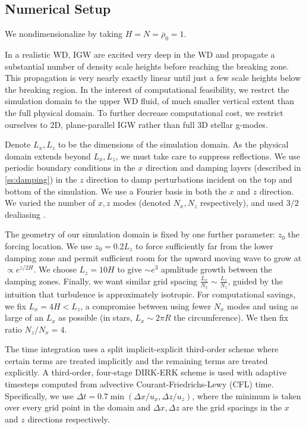 \documentclass[
        fleqn,
        usenatbib,
    ]{mnras}
\begin{document}
\subsection{Numerical Setup}\label{ss:numerics}

We nondimensionalize by taking $H = N = \overline{\rho}_0 = 1$.

In a realistic WD, IGW are excited very deep in the WD and propagate a
substantial number of density scale heights before reaching the breaking zone.
This propagation is very nearly exactly linear until just a few scale heights
below the breaking region. In the interest of computational feasibility, we
restrct the simulation domain to the upper WD fluid, of much smaller vertical
extent than the full physical domain. To further decrease computational cost, we
restrict ourselves to 2D, plane-parallel IGW rather than full 3D stellar
g-modes.

Denote $L_x, L_z$ to be the dimensions of the simulation domain. As the physical
domain extends beyond $L_x, L_z$, we must take care to suppress reflections. We
use periodic boundary conditions in the $x$ direction and damping layers
(described in \autoref{ss:damping}) in the $z$ direction to damp perturbations
incident on the top and bottom of the simulation. We use a Fourier basis in both
the $x$ and $z$ direction. We varied the number of $x, z$ modes (denoted $N_x,
N_z$ respectively), and used $3/2$ dealiasing \citep{boyd}.

The geometry of our simulation domain is fixed by one further parameter: $z_0$
the forcing location. We use $z_0 = 0.2L_z$ to force sufficiently far from the
lower damping zone and permit sufficient room for the upward moving wave to
grow at $\propto e^{z/2H}$. We choose $L_z = 10H$ to give $\sim e^3$ apmlitude
growth between the damping zones. Finally, we want similar grid spacing
$\frac{L_x}{N_x} \sim \frac{L_z}{N_z}$, guided by the intuition that turbulence
is approximately isotropic. For computational savings, we fix $L_x = 4H < L_z$,
a compromise between using fewer $N_x$ modes and using as large of an $L_x$ as
possible (in stars, $L_x \sim 2\pi R$ the circumference). We then fix ratio $N_z
/ N_x = 4$.

The time integration uses a split implicit-explicit third-order scheme where
certain terms are treated implicitly and the remaining terms are treated
explicitly. A third-order, four-stage DIRK-ERK scheme \citep{ascher} is used
with adaptive timesteps computed from advective Courant-Friedrichs-Lewy (CFL)
time. Specifically, we use $\Delta t = 0.7 \min(\Delta x / u_x,\Delta z /
u_{z})$, where the minimum is taken over every grid point in the domain and
$\Delta x,\Delta z$ are the grid spacings in the $x$ and $z$ directions
respectively.
\end{document}
